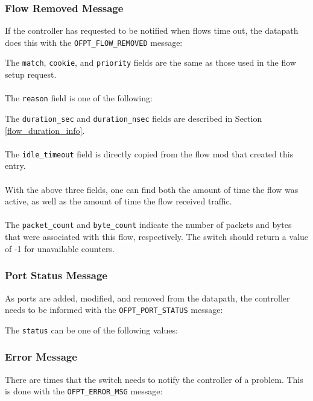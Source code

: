 
 
\subsubsection{Flow Removed Message}
If the controller has requested to be notified when flows time out, the datapath does this with the \verb|OFPT_FLOW_REMOVED| message:


The \verb|match|, \verb|cookie|, and \verb|priority| fields are the same as those used in the flow setup request.
\\\\
The \verb|reason| field is one of the following:


The \verb|duration_sec| and \verb|duration_nsec| fields are described in Section \ref{flow_duration_info}.
\\\\
The \verb|idle_timeout| field is directly copied from the flow mod that created this entry. 
\\\\
With the above three fields, one can find both the amount of time the flow was active, as well as the amount of time the flow received traffic.
\\\\
The \verb|packet_count| and \verb|byte_count| indicate the number of packets and bytes that were associated with this flow, respectively. The switch should return a value of -1 for unavailable counters.
 
\subsubsection{Port Status Message}
As ports are added, modified, and removed from the datapath, the controller needs to be informed with the \verb|OFPT_PORT_STATUS| message:


The \verb|status| can be one of the following values:

 

\subsubsection{Error Message}
There are times that the switch needs to notify the controller of a problem.  This is done with the \verb|OFPT_ERROR_MSG| message: 	

